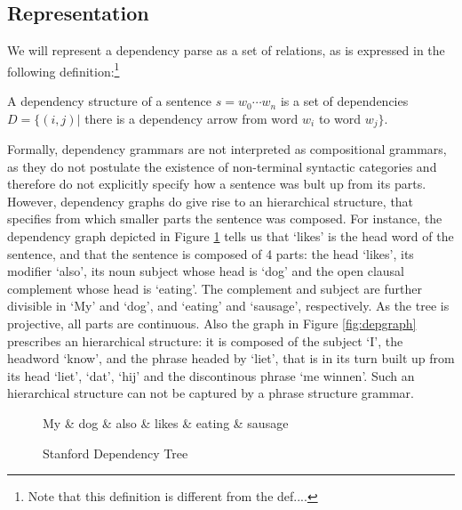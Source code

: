 \documentclass{report}
\begin{document}
\subsection{Representation}

We will represent a dependency parse as a set of relations, as is expressed in the following definition:\footnote{Note that this definition is different from the def....}

\begin{definition}
A dependency structure of a sentence $s = w_0\cdots w_n$ is a set of dependencies $D = \{ (i,j) |$ there is a dependency arrow from word $w_i$ to word $w_j \}$. 
\end{definition}

Formally, dependency grammars are not interpreted as compositional grammars, as they do not postulate the existence of non-terminal syntactic categories and therefore do not explicitly specify how a sentence was bult up from its parts. However, dependency graphs do give rise to an hierarchical structure, that specifies from which smaller parts the sentence was composed. For instance, the dependency graph depicted in Figure \ref{fig:deptree1} tells us that `likes' is the head word of the sentence, and that the sentence is composed of 4 parts: the head `likes', its modifier `also', its noun subject whose head is `dog' and the open clausal complement whose head is `eating'. The complement and subject are further divisible in `My' and `dog', and `eating' and `sausage', respectively. As the tree is projective, all parts are continuous. Also the graph in Figure \ref{fig:depgraph} prescribes an hierarchical structure: it is composed of the subject `I', the headword `know', and the phrase headed by `liet', that is in its turn built up from its head `liet', `dat', `hij' and the discontinous phrase `me winnen'. Such an hierarchical structure can not be captured by a phrase structure grammar.



\begin{figure}[!h]\label{fig:deptree1}
\centering
\begin{dependency}[theme=simple]%
\begin{deptext}[column sep=.5cm, row sep=.1ex]
My \& dog \& also \& likes \& eating \& sausage \\
\end{deptext}
\end{dependency}
\caption{Stanford Dependency Tree}
\end{figure}
\end{document}
